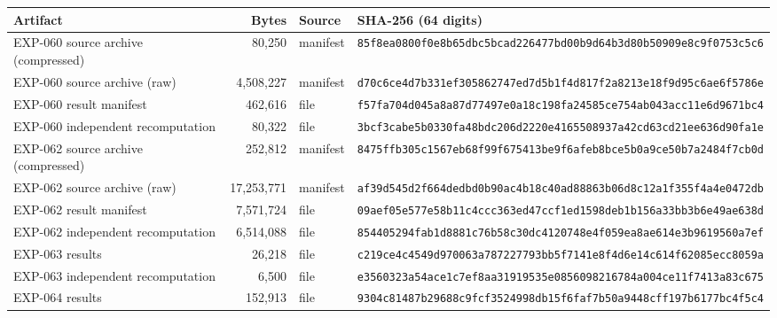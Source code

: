 \documentclass[11pt]{article}
\theoremstyle{definition}
\theoremstyle{remark}
\begin{document}
\begin{table}[t]
\centering\scriptsize
\begin{tabular}{>{\raggedright\arraybackslash}p{}rl>{\raggedright\arraybackslash}p{}}
\toprule
Artifact & Bytes & Source & SHA-256 (64 digits)\\
\midrule
EXP-060 source archive (compressed) & 80,250 & manifest & \texttt{\scriptsize 85f8ea0800f0e8b6\allowbreak 5dbc5bcad226477b\allowbreak d00b9d64b3d80b50\allowbreak 909e8c9f0753c5c6}\\[2pt]
EXP-060 source archive (raw) & 4,508,227 & manifest & \texttt{\scriptsize d70c6ce4d7b331ef\allowbreak 305862747ed7d5b1\allowbreak f4d817f2a8213e18\allowbreak f9d95c6ae6f5786e}\\[2pt]
EXP-060 result manifest & 462,616 & file & \texttt{\scriptsize f57fa704d045a8a8\allowbreak 7d77497e0a18c198\allowbreak fa24585ce754ab04\allowbreak 3acc11e6d9671bc4}\\[2pt]
EXP-060 independent recomputation & 80,322 & file & \texttt{\scriptsize 3bcf3cabe5b0330f\allowbreak a48bdc206d2220e4\allowbreak 165508937a42cd63\allowbreak cd21ee636d90fa1e}\\[2pt]
EXP-062 source archive (compressed) & 252,812 & manifest & \texttt{\scriptsize 8475ffb305c1567e\allowbreak b68f99f675413be9\allowbreak f6afeb8bce5b0a9c\allowbreak e50b7a2484f7cb0d}\\[2pt]
EXP-062 source archive (raw) & 17,253,771 & manifest & \texttt{\scriptsize af39d545d2f664de\allowbreak dbd0b90ac4b18c40\allowbreak ad88863b06d8c12a\allowbreak 1f355f4a4e0472db}\\[2pt]
EXP-062 result manifest & 7,571,724 & file & \texttt{\scriptsize 09aef05e577e58b1\allowbreak 1c4ccc363ed47ccf\allowbreak 1ed1598deb1b156a\allowbreak 33bb3b6e49ae638d}\\[2pt]
EXP-062 independent recomputation & 6,514,088 & file & \texttt{\scriptsize 854405294fab1d88\allowbreak 81c76b58c30dc412\allowbreak 0748e4f059ea8ae6\allowbreak 14e3b9619560a7ef}\\[2pt]
EXP-063 results & 26,218 & file & \texttt{\scriptsize c219ce4c4549d970\allowbreak 063a787227793bb5\allowbreak f7141e8f4d6e14c6\allowbreak 14f62085ecc8059a}\\[2pt]
EXP-063 independent recomputation & 6,500 & file & \texttt{\scriptsize e3560323a54ace1c\allowbreak 7ef8aa31919535e0\allowbreak 856098216784a004\allowbreak ce11f7413a83c675}\\[2pt]
EXP-064 results & 152,913 & file & \texttt{\scriptsize 9304c81487b29688\allowbreak c9fcf3524998db15\allowbreak f6faf7b50a9448cf\allowbreak f197b6177bc4f5c4}\\[2pt]

\end{tabular}
\end{table}
\end{document}
